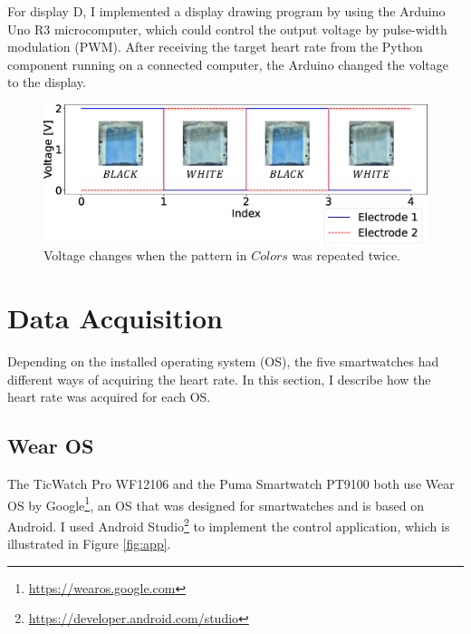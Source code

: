 For display D, I implemented a display drawing program by using the Arduino Uno R3 microcomputer, which could control the output voltage by pulse-width modulation (PWM). After receiving the target heart rate from the Python component running on a connected computer, the Arduino changed the voltage to the display.

\begin{figure}[!t]
  \centering
  \includegraphics[width=1\linewidth]{figures/voltage_wave.eps}
  \caption{Voltage changes when the pattern in $Colors$ was repeated twice.}
  \label{fig:colors_flexible}
\end{figure}


\section{Data Acquisition}
Depending on the installed operating system (OS), the five smartwatches had different ways of acquiring the heart rate. In this section, I describe how the heart rate was acquired for each OS.

\subsection{Wear OS}
The TicWatch Pro WF12106 and the Puma Smartwatch PT9100 both use Wear OS by Google\footnote{\url{https://wearos.google.com}}, an OS that was designed for smartwatches and is based on Android. I used Android Studio\footnote{\url{https://developer.android.com/studio}} to implement the control application, which is illustrated in Figure \ref{fig:app}.\par

